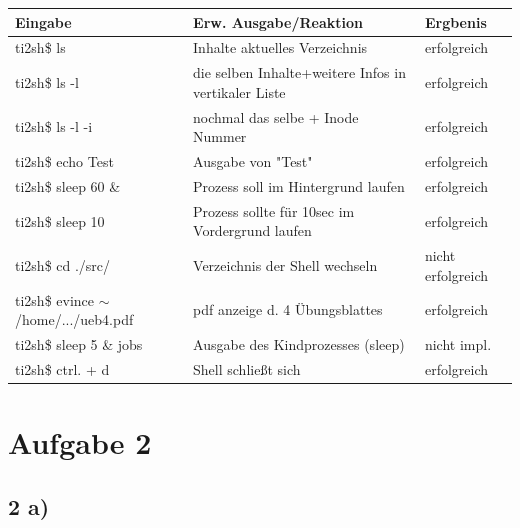 \documentclass{ti2}
\begin{document}
\begin{tabular}{|l|l|l|}
	\hline
	Eingabe & Erw. Ausgabe/Reaktion & Ergbenis\\
	\hline
	ti2sh\$ ls & Inhalte aktuelles Verzeichnis & erfolgreich\\
	\hline
	ti2sh\$ ls -l & die selben Inhalte+weitere Infos in vertikaler Liste & erfolgreich\\
	\hline
	ti2sh\$ ls -l -i & nochmal das selbe + Inode Nummer & erfolgreich\\
	\hline
	ti2sh\$ echo Test & Ausgabe von "Test" & erfolgreich\\
	\hline
	ti2sh\$ sleep 60 \& & Prozess soll im Hintergrund laufen & erfolgreich\\
	\hline
	ti2sh\$ sleep 10 & Prozess sollte für 10sec im Vordergrund laufen & erfolgreich\\
	\hline
	ti2sh\$ cd ./src/ & Verzeichnis der Shell wechseln & nicht erfolgreich\\
	\hline
	ti2sh\$ evince $\sim$/home/.../ueb4.pdf & pdf anzeige d. 4 Übungsblattes & erfolgreich\\
	\hline
	ti2sh\$  sleep 5 \& jobs & Ausgabe des Kindprozesses (sleep) & nicht impl.\\
	\hline
	ti2sh\$ ctrl. + d & Shell schließt sich & erfolgreich\\
	\hline
\end{tabular}

\section*{Aufgabe 2}


\subsection*{2 a)}
\end{document}
